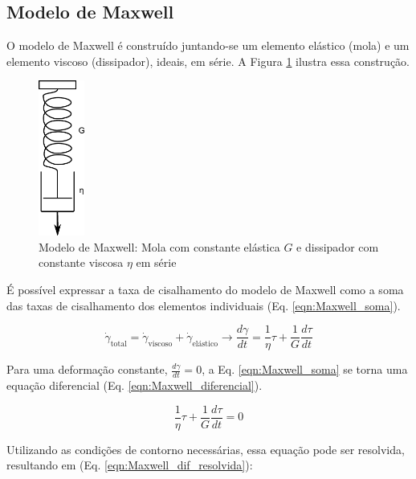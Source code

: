 			\subsection{Modelo de Maxwell}
			
			O modelo de Maxwell é construído juntando-se um elemento elástico (mola) e um elemento viscoso (dissipador), ideais, em série. A Figura \ref{fig:ilust_modelo_maxwell} ilustra essa construção.
			
			\begin{figure}[H]
				\centering
				\includegraphics[width=1.5cm]{./imagens/reologia/maxwell_mola_dissipador}
				\caption{Modelo de Maxwell: Mola com constante elástica \(G\) e dissipador com constante viscosa \(\eta\) em série}
				\label{fig:ilust_modelo_maxwell}
			\end{figure}

			 É possível expressar a taxa de cisalhamento do modelo de Maxwell como a soma das taxas de cisalhamento dos elementos individuais (Eq. \ref{eqn:Maxwell_soma}). 
			 
			\begin{equation}
				\dot{\gamma}_{\textrm{total}} =  \dot{\gamma}_{\textrm{viscoso}} + \dot{\gamma}_{\textrm{elástico}} \to
				\dfrac{d\gamma}{dt} = \dfrac{1}{\eta}\tau + \dfrac{1}{G}\dfrac{d\tau}{dt}
				\label{eqn:Maxwell_soma}
			\end{equation}
			
			Para uma deformação constante, \(\frac{d\gamma}{dt}=0\), a Eq. \ref{eqn:Maxwell_soma} se torna uma equação diferencial (Eq. \ref{eqn:Maxwell_diferencial}).
			
			\begin{equation}
				\dfrac{1}{\eta}\tau + \dfrac{1}{G}\dfrac{d\tau}{dt} = 0
				\label{eqn:Maxwell_diferencial}
			\end{equation}
			
			Utilizando as condições de contorno necessárias, essa equação pode ser resolvida, resultando em (Eq. \ref{eqn:Maxwell_dif_resolvida}):
			
